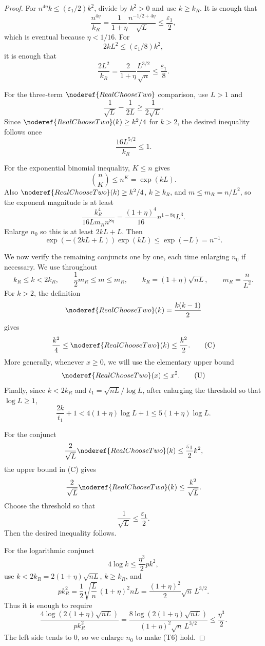 \begin{proof}
For \(n^{4\eta}k\le(\varepsilon_1/2)k^2\), divide by \(k^2>0\) and use
\(k\ge k_R\).  It is enough that
\[
\frac{n^{4\eta}}{k_R}
=\frac{1}{1+\eta}\frac{n^{-1/2+4\eta}}{\sqrt L}
\le\frac{\varepsilon_1}{2},
\]
which is eventual because \(\eta<1/16\).  For
\[
2kL^2\le(\varepsilon_1/8)k^2,
\]
it is enough that
\[
\frac{2L^2}{k_R}
=\frac{2}{1+\eta}\frac{L^{3/2}}{\sqrt n}
\le\frac{\varepsilon_1}{8}.
\]

For the three-term \(\noderef{RealChooseTwo}\) comparison, use \(L>1\) and
\[
\frac1{\sqrt L}-\frac1{2L}\ge\frac1{2\sqrt L}.
\]
Since \(\noderef{RealChooseTwo}(k)\ge k^2/4\) for \(k>2\), the desired
inequality follows once
\[
\frac{16L^{5/2}}{k_R}\le1.
\]

For the exponential binomial inequality, \(K\le n\) gives
\[
\binom nK\le n^K=\exp(kL).
\]
Also \(\noderef{RealChooseTwo}(k)\ge k^2/4\), \(k\ge k_R\), and
\(m\le m_R=n/L^2\), so the exponent magnitude is at least
\[
\frac{k_R^4}{16Lm_R n^{8\eta}}
=\frac{(1+\eta)^4}{16}n^{1-8\eta}L^3.
\]
Enlarge \(n_0\) so this is at least \(2kL+L\).  Then
\[
\exp(-(2kL+L))\exp(kL)\le\exp(-L)=n^{-1}.
\]

We now verify the remaining conjuncts one by one, each time enlarging \(n_0\)
if necessary.  We use throughout
\[
k_R\le k<2k_R,\qquad \frac12m_R\le m\le m_R,\qquad
k_R=(1+\eta)\sqrt{nL},\qquad m_R=\frac n{L^2}.
\tag{A}
\]
For \(k>2\), the definition
\[
\noderef{RealChooseTwo}(k)=\frac{k(k-1)}2
\]
gives
\[
\frac{k^2}{4}\le \noderef{RealChooseTwo}(k)\le\frac{k^2}{2}. \tag{C}
\]
More generally, whenever \(x\ge0\), we will use the elementary upper bound
\[
\noderef{RealChooseTwo}(x)\le x^2. \tag{U}
\]
Finally, since \(k<2k_R\) and \(t_1=\sqrt{nL}/\log L\), after enlarging the
threshold so that \(\log L\ge1\),
\[
\frac{2k}{t_1}+1
<4(1+\eta)\log L+1
\le 5(1+\eta)\log L. \tag{D}
\]

For the conjunct
\[
\frac{2}{\sqrt L}\noderef{RealChooseTwo}(k)
\le \frac{\varepsilon_1}{2}k^2,
\]
the upper bound in (C) gives
\[
\frac{2}{\sqrt L}\noderef{RealChooseTwo}(k)
\le \frac{k^2}{\sqrt L}.
\]
Choose the threshold so that
\[
\frac1{\sqrt L}\le \frac{\varepsilon_1}{2}. \tag{T5}
\]
Then the desired inequality follows.

For the logarithmic conjunct
\[
4\log k\le \frac{\eta^3}{2}pk^2,
\]
use \(k<2k_R=2(1+\eta)\sqrt{nL}\), \(k\ge k_R\), and
\[
p k_R^2
=\frac12\sqrt{\frac Ln}\,(1+\eta)^2nL
=\frac{(1+\eta)^2}{2}\sqrt n\,L^{3/2}.
\]
Thus it is enough to require
\[
\frac{4\log(2(1+\eta)\sqrt{nL})}{p k_R^2}
=
\frac{8\log(2(1+\eta)\sqrt{nL})}
{(1+\eta)^2\sqrt n\,L^{3/2}}
\le \frac{\eta^3}{2}. \tag{T6}
\]
The left side tends to \(0\), so we enlarge \(n_0\) to make (T6) hold.


\end{proof}
